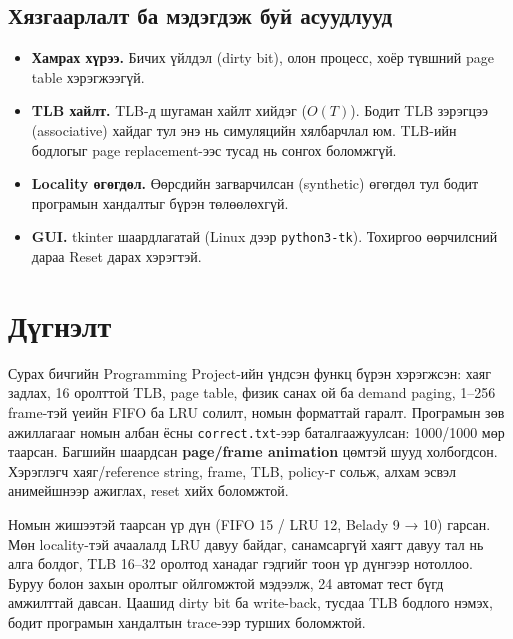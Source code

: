\subsection{Хязгаарлалт ба мэдэгдэж буй асуудлууд}
\begin{itemize}
\item \textbf{Хамрах хүрээ.} Бичих үйлдэл (dirty bit), олон процесс, хоёр түвшний page table хэрэгжээгүй.
\item \textbf{TLB хайлт.} TLB-д шугаман хайлт хийдэг ($O(T)$). Бодит TLB зэрэгцээ (associative) хайдаг тул энэ нь симуляцийн хялбарчлал юм. TLB-ийн бодлогыг page replacement-ээс тусад нь сонгох боломжгүй.
\item \textbf{Locality өгөгдөл.} Өөрсдийн загварчилсан (synthetic) өгөгдөл тул бодит програмын хандалтыг бүрэн төлөөлөхгүй.
\item \textbf{GUI.} tkinter шаардлагатай (Linux дээр \texttt{python3-tk}). Тохиргоо өөрчилсний дараа Reset дарах хэрэгтэй.
\end{itemize}

\section{Дүгнэлт}
Сурах бичгийн Programming Project-ийн үндсэн функц бүрэн хэрэгжсэн: хаяг задлах, 16 оролттой TLB, page table, физик санах ой ба demand paging, 1–256 frame-тэй үеийн FIFO ба LRU солилт, номын форматтай гаралт. Програмын зөв ажиллагааг номын албан ёсны \texttt{correct.txt}-ээр баталгаажуулсан: 1000/1000 мөр таарсан. Багшийн шаардсан \textbf{page/frame animation} цөмтэй шууд холбогдсон. Хэрэглэгч хаяг/reference string, frame, TLB, policy-г сольж, алхам эсвэл анимейшнээр ажиглах, reset хийх боломжтой.

Номын жишээтэй таарсан үр дүн (FIFO 15 / LRU 12, Belady 9 → 10) гарсан. Мөн locality-тэй ачаалалд LRU давуу байдаг, санамсаргүй хаягт давуу тал нь алга болдог, TLB 16–32 оролтод ханадаг гэдгийг тоон үр дүнгээр нотоллоо. Буруу болон захын оролтыг ойлгомжтой мэдээлж, 24 автомат тест бүгд амжилттай давсан. Цаашид dirty bit ба write-back, тусдаа TLB бодлого нэмэх, бодит програмын хандалтын trace-ээр турших боломжтой.

